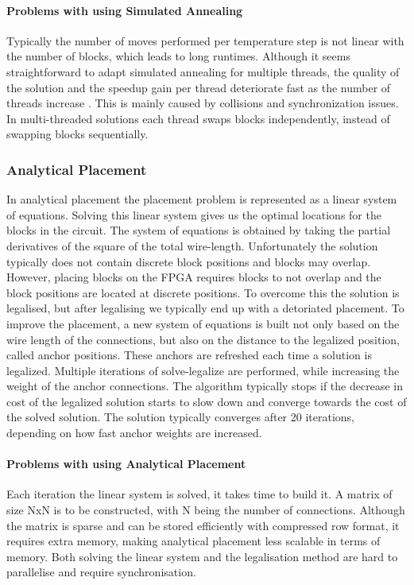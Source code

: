 \documentclass[a4paper,oneside,12pt]{article}
\begin{document}
\paragraph{Problems with using Simulated Annealing}
Typically the number of moves performed per temperature step is not linear with the number of blocks, which leads to long runtimes.
Although it seems straightforward to adapt simulated annealing for multiple threads, the quality of the solution and the speedup gain per thread deteriorate fast as the number of threads increase \cite{ludwin2011}. This is mainly caused by collisions and synchronization issues. In multi-threaded solutions each thread swaps blocks independently, instead of swapping blocks sequentially.

\subsubsection{Analytical Placement}
In analytical placement the placement problem is represented as a linear system of equations. Solving this linear system gives us the optimal locations for the blocks in the circuit. The system of equations is obtained by taking the partial derivatives of the square of the total wire-length. 
Unfortunately the solution typically does not contain discrete block positions and blocks may overlap. However, placing blocks on the FPGA requires blocks to not overlap and the block positions are located at discrete positions. 
To overcome this the solution is legalised, but after legalising we typically end up with a detoriated placement. To improve the placement, a new system of equations is built not only based on the wire length of the connections, but also on the distance to the legalized position, called anchor positions. These anchors are refreshed each time a solution is legalized.
Multiple iterations of solve-legalize are performed, while increasing the weight of the anchor connections. The algorithm typically stops if the decrease in cost of the legalized solution starts to slow down and converge towards the cost of the solved solution.  The solution typically converges after 20 iterations, depending on how fast anchor weights are increased. 

\paragraph{Problems with using Analytical Placement}
Each iteration the linear system is solved, it takes time to build it. A matrix of size NxN is to be constructed, with N being the number of connections. Although the matrix is sparse and can be stored efficiently with compressed row format, it requires extra memory, making analytical placement less scalable in terms of memory.
Both solving the linear system and the legalisation method are hard to parallelise and require synchronisation.
\end{document}
